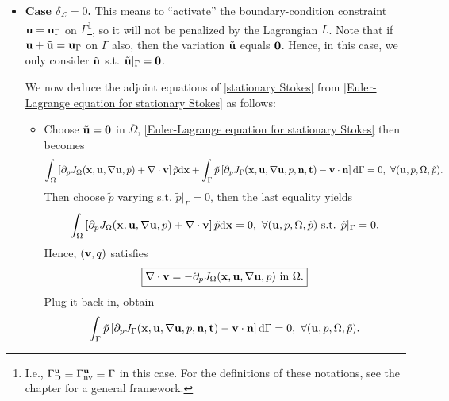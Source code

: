 \documentclass[oneside]{book}
\numberwithin{equation}{section}
\begin{document}
\begin{itemize}
    \item \textbf{Case $\delta_{\mathcal{L}} = 0$.} This means to ``activate'' the boundary-condition constraint ${\bf u} = {\bf u}_\Gamma$ on $\Gamma$\footnote{I.e., $\Gamma_{\rm D}^{\bf u}\equiv\Gamma_{\rm nv}^{\bf u}\equiv\Gamma$ in this case. For the definitions of these notations, see the chapter for a general framework.}, so it will not be penalized by the Lagrangian $L$. Note that if ${\bf u} + \tilde{\bf u} = {\bf u}_\Gamma$ on $\Gamma$ also, then the variation $\tilde{\bf u}$ equals ${\bf 0}$. Hence, in this case, we only consider $\tilde{\bf u}$ s.t. $\tilde{\bf u}|_\Gamma = {\bf 0}$.
    
    We now deduce the adjoint equations of \eqref{stationary Stokes} from \eqref{Euler-Lagrange equation for stationary Stokes} as follows:
    \begin{itemize}
        \item Choose $\tilde{\bf u} = {\bf 0}$ in $\overline{\Omega}$, \eqref{Euler-Lagrange equation for stationary Stokes} then becomes
        \begin{align*}
            \int_\Omega \left[\partial_pJ_\Omega({\bf x},{\bf u},\nabla{\bf u},p) + \nabla\cdot{\bf v}\right]\tilde{p}{\rm d}{\bf x} + \int_\Gamma \tilde{p}\left[\partial_pJ_\Gamma({\bf x},{\bf u},\nabla{\bf u},p,{\bf n},{\bf t}) - {\bf v}\cdot{\bf n}\right]{\rm d}\Gamma = 0,\ \forall({\bf u},p,\Omega,\tilde{p}).
        \end{align*}
        Then choose $\tilde{p}$ varying s.t. $\tilde{p}|_\Gamma = 0$, then the last equality yields
        \begin{align*}
            \int_\Omega \left[\partial_pJ_\Omega({\bf x},{\bf u},\nabla{\bf u},p) + \nabla\cdot{\bf v}\right]\tilde{p}{\rm d}{\bf x} = 0,\ \forall({\bf u},p,\Omega,\tilde{p}) \mbox{ s.t. } \tilde{p}|_\Gamma = 0.
        \end{align*}
        Hence, $({\bf v},q)$ satisfies
        \begin{align}
            \label{stationary Stokes: domain integrand variation p}
            \boxed{\nabla\cdot{\bf v} = -\partial_pJ_\Omega({\bf x},{\bf u},\nabla{\bf u},p) \mbox{ in } \Omega.}
        \end{align}
        Plug it back in, obtain
        \begin{align*}
            \int_\Gamma \tilde{p}\left[\partial_pJ_\Gamma({\bf x},{\bf u},\nabla{\bf u},p,{\bf n},{\bf t}) - {\bf v}\cdot{\bf n}\right]{\rm d}\Gamma = 0,\ \forall({\bf u},p,\Omega,\tilde{p}).

\end{align*}
\end{itemize}
\end{itemize}
\end{document}
